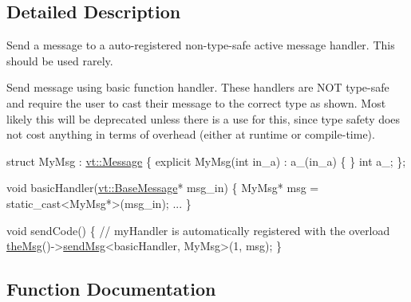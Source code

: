 \subsection{Detailed Description}
Send a message to a auto-\/registered non-\/type-\/safe active message handler. This should be used rarely. 

Send message using basic function handler. These handlers are N\+OT type-\/safe and require the user to cast their message to the correct type as shown. Most likely this will be deprecated unless there is a use for this, since type safety does not cost anything in terms of overhead (either at runtime or compile-\/time).


\begin{DoxyCode}
\textcolor{keyword}{struct }MyMsg : \hyperlink{structvt_1_1messaging_1_1_active_msg}{vt::Message} \{
  \textcolor{keyword}{explicit} MyMsg(\textcolor{keywordtype}{int} in\_a) : a\_(in\_a) \{ \}
  \textcolor{keywordtype}{int} a\_;
\};

\textcolor{keywordtype}{void} basicHandler(\hyperlink{structvt_1_1messaging_1_1_base_msg}{vt::BaseMessage}* msg\_in) \{
  MyMsg* msg = \textcolor{keyword}{static\_cast<}MyMsg*\textcolor{keyword}{>}(msg\_in);
  ...
\}

\textcolor{keywordtype}{void} sendCode() \{
  \textcolor{comment}{// myHandler is automatically registered with the overload}
  \hyperlink{namespacevt_aeafd31f866aeb4dc6fc2f6ee97136350}{theMsg}()->\hyperlink{group__preregister_ga0162a39473e7f9b490a79a7983d949ac}{sendMsg}<basicHandler, MyMsg>(1, msg);
\}
\end{DoxyCode}
 

\subsection{Function Documentation}
\mbox{\label{group__basicsend_ga880e93f0c239c1aa9c9ade805d75dd7a}} 
